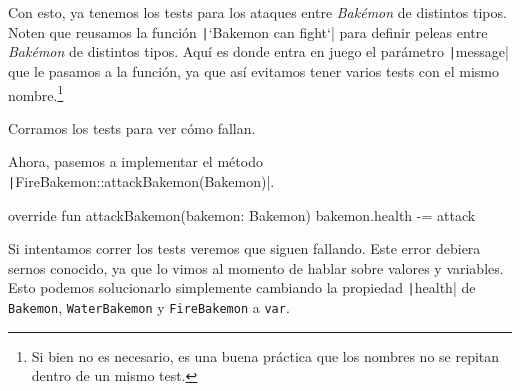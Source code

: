 
  Con esto, ya tenemos los tests para los ataques entre \textit{Bakémon} de distintos tipos.
  Noten que reusamos la función \texttt|`Bakemon can fight`| para definir peleas entre
  \textit{Bakémon} de distintos tipos.
  Aquí es donde entra en juego el parámetro \texttt|message| que le pasamos a la 
  función, ya que así evitamos tener varios tests con el mismo nombre.\footnote{Si bien no es
  necesario, es una buena práctica que los nombres no se repitan dentro de un mismo test.}

  Corramos los tests para ver cómo fallan.

  Ahora, pasemos a implementar el método \texttt|FireBakemon::attackBakemon(Bakemon)|.

  \begin{kotlin}
    override fun attackBakemon(bakemon: Bakemon) {
      bakemon.health -= attack
    }
  \end{kotlin}

  Si intentamos correr los tests veremos que siguen fallando.
  Este error debiera sernos conocido, ya que lo vimos al momento de hablar sobre valores y 
  variables.
  Esto podemos solucionarlo simplemente cambiando la propiedad \texttt|health| de
  \texttt{Bakemon}, \texttt{WaterBakemon} y \texttt{FireBakemon}
  a \texttt{var}.